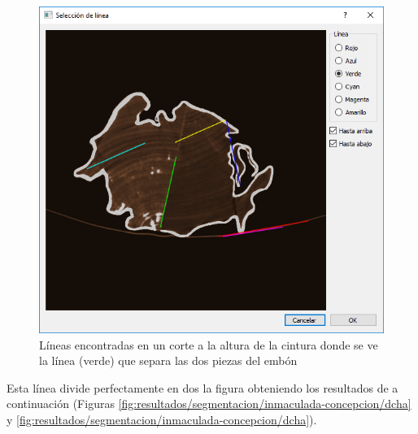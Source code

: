 \begin{figure}[H]
	\centering
	\includegraphics[width=12cm]{imagenes/resultados/segmentacion/inmaculada-concepcion/seleccion-linea}
	\caption{Líneas encontradas en un corte a la altura de la cintura donde se ve la línea (verde) que separa las dos piezas del embón}
	\label{fig:resultados/segmentacion/inmaculada-concepcion/seleccion-linea}
\end{figure}

Esta línea divide perfectamente en dos la figura obteniendo los resultados de a continuación (Figuras \ref{fig:resultados/segmentacion/inmaculada-concepcion/dcha} y \ref{fig:resultados/segmentacion/inmaculada-concepcion/dcha}).

